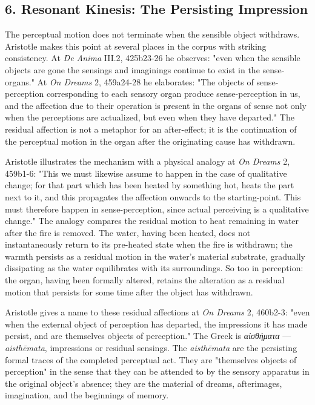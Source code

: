 \documentclass[12pt]{article}
\newcommand{\gk}[1]{{\greekfont #1}}%
\newcommand{\gk}[1]{{\greekfont #1}}%
\newcommand{\gk}[1]{#1}%
\begin{document}
\subsection*{6. Resonant Kinesis: The Persisting Impression}

The perceptual motion does not terminate when the sensible object withdraws. Aristotle makes this point at several places in the corpus with striking consistency. At \textit{De Anima} III.2, 425b23-26 he observes: "even when the sensible objects are gone the sensings and imaginings continue to exist in the sense-organs." At \textit{On Dreams} 2, 459a24-28 he elaborates: "The objects of sense-perception corresponding to each sensory organ produce sense-perception in us, and the affection due to their operation is present in the organs of sense not only when the perceptions are actualized, but even when they have departed." The residual affection is not a metaphor for an after-effect; it is the continuation of the perceptual motion in the organ after the originating cause has withdrawn.

Aristotle illustrates the mechanism with a physical analogy at \textit{On Dreams} 2, 459b1-6: "This we must likewise assume to happen in the case of qualitative change; for that part which has been heated by something hot, heats the part next to it, and this propagates the affection onwards to the starting-point. This must therefore happen in sense-perception, since actual perceiving is a qualitative change." The analogy compares the residual motion to heat remaining in water after the fire is removed. The water, having been heated, does not instantaneously return to its pre-heated state when the fire is withdrawn; the warmth persists as a residual motion in the water's material substrate, gradually dissipating as the water equilibrates with its surroundings. So too in perception: the organ, having been formally altered, retains the alteration as a residual motion that persists for some time after the object has withdrawn.

Aristotle gives a name to these residual affections at \textit{On Dreams} 2, 460b2-3: "even when the external object of perception has departed, the impressions it has made persist, and are themselves objects of perception." The Greek is \textit{\gk{αἰσθήματα}} --- \textit{aisthēmata}, impressions or residual sensings. The \textit{aisthēmata} are the persisting formal traces of the completed perceptual act. They are "themselves objects of perception" in the sense that they can be attended to by the sensory apparatus in the original object's absence; they are the material of dreams, afterimages, imagination, and the beginnings of memory.
\end{document}
